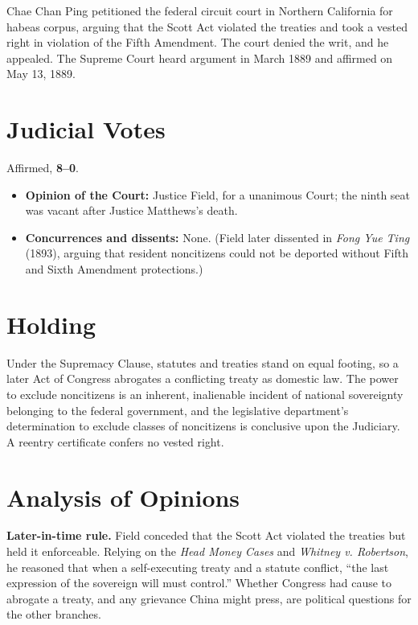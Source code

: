 \documentclass[12pt]{article}
\begin{document}
Chae Chan Ping petitioned the federal circuit court in Northern California for habeas corpus, arguing that the Scott Act violated the treaties and took a vested right in violation of the Fifth Amendment. The court denied the writ, and he appealed. The Supreme Court heard argument in March 1889 and affirmed on May 13, 1889.

\section{Judicial Votes}

Affirmed, \textbf{8--0}.
\begin{itemize}
\item \textbf{Opinion of the Court:} Justice Field, for a unanimous Court; the ninth seat was vacant after Justice Matthews's death.
\item \textbf{Concurrences and dissents:} None. (Field later dissented in \textit{Fong Yue Ting} (1893), arguing that resident noncitizens could not be deported without Fifth and Sixth Amendment protections.)
\end{itemize}

\section{Holding}

Under the Supremacy Clause, statutes and treaties stand on equal footing, so a later Act of Congress abrogates a conflicting treaty as domestic law. The power to exclude noncitizens is an inherent, inalienable incident of national sovereignty belonging to the federal government, and the legislative department's determination to exclude classes of noncitizens is conclusive upon the Judiciary. A reentry certificate confers no vested right.

\section{Analysis of Opinions}

\textbf{Later-in-time rule.} Field conceded that the Scott Act violated the treaties but held it enforceable. Relying on the \textit{Head Money Cases} and \textit{Whitney v. Robertson}, he reasoned that when a self-executing treaty and a statute conflict, ``the last expression of the sovereign will must control.'' Whether Congress had cause to abrogate a treaty, and any grievance China might press, are political questions for the other branches.
\end{document}
